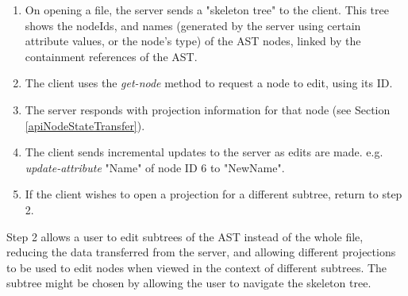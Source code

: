 \documentclass{article}
\begin{document}
\begin{enumerate}
\item On opening a file, the server sends a "skeleton tree" to the client. This tree shows the nodeIds, and names (generated by the server using certain attribute values, or the node's type) of the AST nodes, linked by the containment references of the AST.
\item The client uses the \emph{get-node} method to request a node to edit, using its ID. 
\item The server responds with projection information for that node (see Section \ref{apiNodeStateTransfer}).
\item The client sends incremental updates to the server as edits are made. e.g. \emph{update-attribute} "Name" of node ID 6 to "NewName".
\item If the client wishes to open a projection for a different subtree, return to step 2.
\end{enumerate}{
Step 2 allows a user to edit subtrees of the AST instead of the whole file, reducing the data transferred from the server, and allowing different projections to be used to edit nodes when viewed in the context of different subtrees. The subtree might be chosen by allowing the user to navigate the skeleton tree.

}
\end{document}
